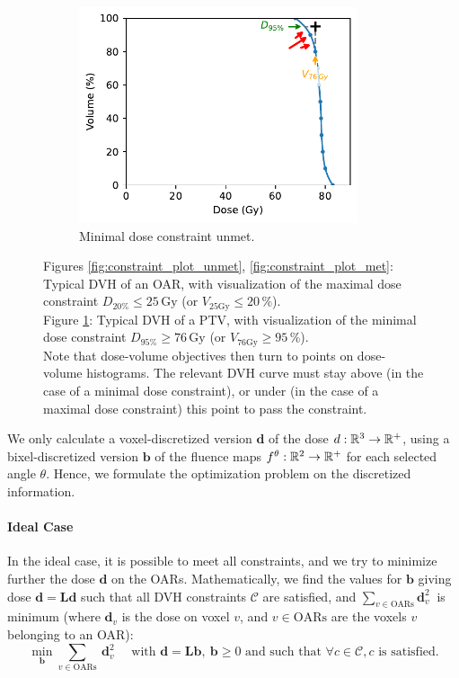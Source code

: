 \begin{figure}
\begin{subfigure}{0.32\textwidth}
		\includegraphics[width=0.9\textwidth]{constraint_plot_min.pdf}
		\caption{Minimal dose constraint unmet.}
		\label{fig:constraint_plot_min}
	\end{subfigure}
	\caption*{
		Figures \ref{fig:constraint_plot_unmet}, \ref{fig:constraint_plot_met}:
		Typical DVH of an OAR, with visualization of the maximal dose constraint $D_{20\%} \leq 25\,\text{Gy}$ (or $V_{25\text{Gy}} \leq 20\,\%$).\\
		Figure \ref{fig:constraint_plot_min}:
		Typical DVH of a PTV, with visualization of the minimal dose constraint $D_{95\%} \geq 76\,\text{Gy}$ (or $V_{76\text{Gy}} \geq 95\,\%$).\\
		Note that dose-volume objectives then turn to points on dose-volume histograms.
		The relevant DVH curve must stay above (in the case of a minimal dose constraint), or under (in the case of a maximal dose constraint) this point to pass the constraint.
	}
	\label{fig:constraint_plot}
\end{figure}

We only calculate a voxel-discretized version $\mathbf{d}$ of the dose $d: \mathbb{R}^3 \to \mathbb{R}^+$, using a bixel-discretized version $\mathbf{b}$ of the fluence maps $f^\theta: \mathbb{R}^2 \to \mathbb{R}^+$ for each selected angle $\theta$.
Hence, we formulate the optimization problem on the discretized information.

\paragraph{Ideal Case}
In the ideal case, it is possible to meet all constraints, and we try to minimize further the dose $\mathbf{d}$ on the OARs.
Mathematically, we find the values for $\mathbf{b}$ giving dose $\mathbf{d} = \textbf{L}\mathbf{d}$ such that all DVH constraints $\mathcal{C}$ are satisfied, and $\sum_{v \in \text{OARs}} \mathbf{d}_v^2 \ $ is minimum (where $\mathbf{d}_v$ is the dose on voxel $v$, and $v \in \text{OARs}$ are the voxels $v$ belonging to an OAR):
$$
\min_{\mathbf{b}} \sum_{v \in \text{OARs}} \ \mathbf{d}_v^2
\quad \text{ with }
\mathbf{d} = \textbf{L}\mathbf{b}, \ \mathbf{b} \geq 0
\text{ and such that }
\forall c \in \mathcal{C}, c \text{ is satisfied.}
$$

